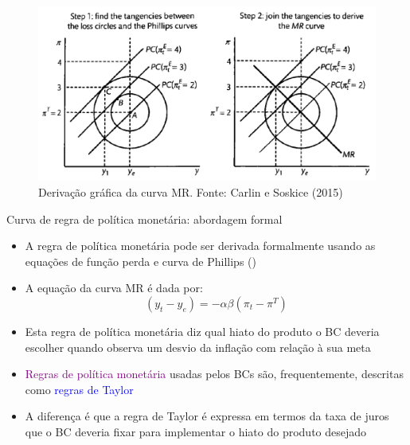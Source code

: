 \documentclass[10pt]{beamer}
\begin{document}
\begin{frame}
    \begin{figure}
        \includegraphics[width=.9\textwidth]{./figures/aula16_fig6.PNG}
        \caption{Derivação gráfica da curva MR. Fonte: Carlin e Soskice (2015)}
    \end{figure}
\end{frame}

\begin{frame}
    {Curva de regra de política monetária: abordagem formal}
    \begin{itemize}
        \item A regra de política monetária pode ser derivada formalmente usando as equações de função perda e curva de Phillips ()\bigskip
        \item A equação da curva MR é dada por:
        \begin{equation}
            (y_t - y_e) = -\alpha\beta(\pi_t - \pi^T)
        \end{equation}
        \item Esta regra de política monetária diz qual hiato do produto o BC deveria escolher quando observa um desvio da inflação com relação à sua meta\bigskip
        \item \textcolor{purple}{Regras de política monetária} usadas pelos BCs são, frequentemente, descritas como \textcolor{blue}{regras de Taylor}\bigskip
        \item A diferença é que a regra de Taylor é expressa em termos da taxa de juros que o BC deveria fixar para implementar o hiato do produto desejado
    \end{itemize}
\end{frame}
\end{document}
